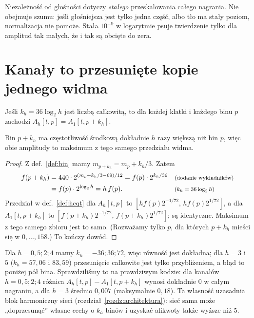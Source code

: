 \begin{pulapka}
Niezależność od głośności dotyczy \emph{stałego} przeskalowania całego nagrania. Nie obejmuje szumu: jeśli głośniejsza jest tylko jedna część,
albo tło ma stały poziom, normalizacja nie pomoże. Stała $10^{-9}$ w logarytmie psuje twierdzenie tylko dla amplitud tak małych, że i tak są obcięte do zera.
\end{pulapka}

\section{Kanały to przesunięte kopie jednego widma}

\begin{twierdzenie}\label{tw:przesuniecie-kanalow}
Jeśli $k_h=36\log_2h$ jest liczbą całkowitą, to dla każdej klatki i każdego binu $p$ zachodzi $A_h[t,p]=A_1[t,p+k_h]$.
\end{twierdzenie}
\begin{pomyslDowodu}
Bin $p+k_h$ ma częstotliwość środkową dokładnie $h$ razy większą niż bin $p$, więc obie amplitudy to maksimum z tego samego przedziału widma.
\end{pomyslDowodu}
\begin{proof}
Z def.~\ref{def:bin} mamy $m_{p+k_h}=m_p+k_h/3$. Zatem
\begin{align*}
f(p+k_h) &= 440\cdot2^{(m_p+k_h/3-69)/12}=f(p)\cdot2^{k_h/36} && \text{\footnotesize (dodanie wykładników)}\\
 &= f(p)\cdot2^{\log_2h}=h\,f(p). && \text{\footnotesize ($k_h=36\log_2h$)}
\end{align*}
Przedział w def.~\ref{def:hcqt} dla $A_h[t,p]$ to $[hf(p)2^{-1/72},\,hf(p)2^{1/72}]$, a dla $A_1[t,p+k_h]$ to $[f(p+k_h)2^{-1/72},\,f(p+k_h)2^{1/72}]$; są identyczne.
Maksimum z tego samego zbioru jest to samo. (Rozważamy tylko $p$, dla których $p+k_h$ mieści się w $0,\dots,158$.) To kończy dowód.
\end{proof}

Dla $h=0{,}5;2;4$ mamy $k_h=-36;36;72$, więc równość jest dokładna; dla $h=3$ i $5$ ($k_h=57{,}06$ i $83{,}59$) przesunięcie całkowite
jest tylko przybliżeniem, a błąd to poniżej pół bina. Sprawdziliśmy to na prawdziwym kodzie: dla kanałów $h=0{,}5;2;4$ różnica
$A_h[t,p]-A_1[t,p+k_h]$ wynosi dokładnie $0$ w całym nagraniu, a dla $h=3$ średnio $0{,}007$ (maksymalnie $0{,}18$). Ta własność uzasadnia
blok harmoniczny sieci (rozdział~\ref{rozdz:architektura}): sieć sama może „doprzesunąć” własne cechy o $k_h$ binów i uzyskać alikwoty także wyższe niż $5$.

